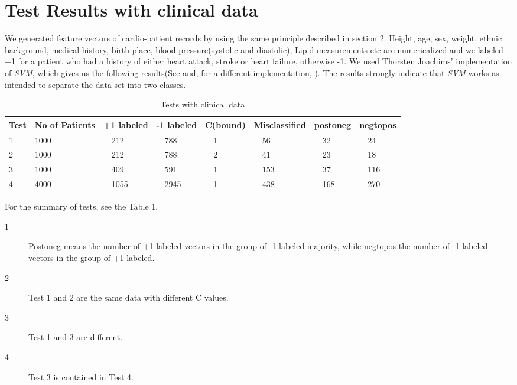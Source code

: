 \documentclass{amsart}%
\theoremstyle{plain}
\numberwithin{equation}{section}
\begin{document}
\section{Test Results with clinical data}

We generated feature vectors of cardio-patient records by using the same principle described in section 2.
Height, age, sex, weight, ethnic background, medical
history, birth place, blood pressure(systolic and diastolic), Lipid
measurements etc are numericalized and we labeled +1 for a patient who had a history of either heart attack, stroke or heart failure, otherwise -1.  We used Thorsten Joachims' implementation of \emph{SVM}, which gives us the following results(See \cite{Jo}
and, for a different implementation, \cite{Van}). The results strongly
indicate that \emph{SVM} works as intended to separate the data set into
two classes. 

\begin{table}[tbp]
\begin{center}
\begin{tabular}{|l|l|l|l|l|l|l|l|}
\hline
Test & No of Patients & +1 labeled & -1 labeled & C(bound) & Misclassified
& postoneg & negtopos\\ \hline
1 & 1000 & \ \ 212 & \ \ 788 & \ \ 1 & \ \ 56 & \ \ 32 & \ \ 24\\ 
2 & 1000 & \ \ 212 & \ \ 788 & \ \ 2 & \ \ 41 & \ \  23 & \ \ 18 \\ 
3 & 1000 & \ \ 409 & \ \ 591 & \ \ 1 & \ \ 153 & \ \ 37 & \ \ 116 \\ 
4 & 4000 & \ \ 1055 & \ \ 2945 & \ \ 1 & \ \ 438 & \ \ 168 & \ \ 270\\ \hline
\end{tabular}
\end{center}
\caption{Tests with clinical data}
\label{tb:slopes}
\end{table}

For the summary of tests, see the Table 1.

\begin{description}
\item[1] Postoneg means the number of +1 labeled vectors in the group of -1 labeled majority, while negtopos the number of -1 labeled vectors in the group of +1 labeled.

\item[2] Test 1 and 2 are the same data with different C values.
\item[3] Test 1 and 3 are different.
\item[4] Test 3 is contained in Test 4. 
\end{description}
\end{document}
